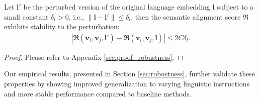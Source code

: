 \begin{theorem}\label{thm:robustness}
    Let $\mathbf{l}'$ be the perturbed version of the original language embedding $\mathbf{l}$ subject to a small constant $\delta_l>0$, i.e., $\|\mathbf{l}-\mathbf{l}'\| \leq \delta_l$, then the semantic alignment score $\mathfrak{R}$ exhibits 
stability to the perturbation:
\begin{align}
    |\mathfrak{R}(\mathbf{v}_i, \mathbf{v}_j, \mathbf{l}') - \mathfrak{R}(\mathbf{v}_i, \mathbf{v}_j, \mathbf{l})|\leq 2C\delta_l.
\end{align} 
\end{theorem}
\begin{proof}
Please refer to Appendix \ref{sec:proof_robustness}.
\end{proof}
Our empirical results, presented in Section \ref{sec:robustness}, further validate these properties by showing improved generalization to varying linguistic instructions and more stable performance compared to baseline methods.











